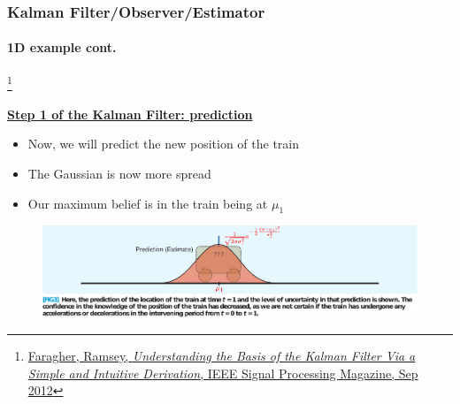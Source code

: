 \documentclass{beamer}
\newenvironment{changemargin}[2]
	{
	  	\begin{list}{}
		{
			\setlength{\topsep}{0pt}%
			\setlength{\leftmargin}{#1}%
			\setlength{\rightmargin}{#2}%
			\setlength{\listparindent}{\parindent}%
			\setlength{\itemindent}{\parindent}%
			\setlength{\parsep}{\parskip}%
		}
	  	\item[]
		}
		{\end{list}
	}
\begin{document}
\begin{frame}[plain]
\frametitle{Kalman Filter/Observer/Estimator}
\framesubtitle{1D example \tiny cont.}

\footnote{\tiny\hspace{-0.23in} \href{http://www.cl.cam.ac.uk/~rmf25/papers/Understanding the Basis of the Kalman Filter.pdf}{Faragher, Ramsey, \emph{Understanding the Basis of the Kalman Filter Via a Simple and Intuitive Derivation}, IEEE Signal Processing Magazine, Sep 2012}}
\scriptsize
\begin{changemargin}{-1.3in}{0in}
\underline{\textbf{Step 1 of the Kalman Filter: prediction}}
\begin{itemize}\scriptsize
\item Now, we will predict the new position of the train
\item The Gaussian is now more spread
\item Our maximum belief is in the train being at {\color{red}$\mu_1$}
\end{itemize}
\begin{figure}[h]
\centering
\includegraphics[width=1.35\textwidth]{figs/2012_MAG_Understanding_the_Basis_of_the_Kalman_Filter_fig3.pdf}
\end{figure}
\end{changemargin}
\end{frame}
\end{document}
